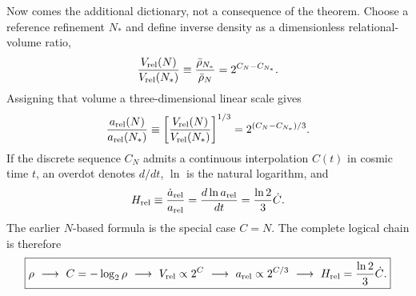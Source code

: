 \documentclass[10pt]{article}
\begin{document}
Now comes the additional dictionary, not a consequence of the theorem.  Choose
a reference refinement $N_*$ and define inverse density as a dimensionless
relational-volume ratio,
\begin{equation}
\frac{V_{\rm rel}(N)}{V_{\rm rel}(N_*)}
\equiv\frac{\bar\rho_{N_*}}{\bar\rho_N}
=2^{C_N-C_{N_*}}.
\label{eq:relational-volume}
\end{equation}
Assigning that volume a three-dimensional linear scale gives
\begin{equation}
\frac{a_{\rm rel}(N)}{a_{\rm rel}(N_*)}
\equiv\left[\frac{V_{\rm rel}(N)}{V_{\rm rel}(N_*)}\right]^{1/3}
=2^{(C_N-C_{N_*})/3}.
\label{eq:relational-scale}
\end{equation}
If the discrete sequence $C_N$ admits a continuous interpolation $C(t)$ in
cosmic time $t$, an overdot denotes $d/dt$, $\ln$ is the natural logarithm,
and
\begin{equation}
H_{\rm rel}\equiv\frac{\dot a_{\rm rel}}{a_{\rm rel}}
=\frac{d\ln a_{\rm rel}}{dt}
=\frac{\ln2}{3}\dot C.
\label{eq:bridge}
\end{equation}
The earlier $N$-based formula is the special case $C=N$.  The complete logical
chain is therefore
\begin{equation}
\boxed{
\rho\ \longrightarrow\ C=-\log_2\rho
\ \longrightarrow\ V_{\rm rel}\propto2^C
\ \longrightarrow\ a_{\rm rel}\propto2^{C/3}
\ \longrightarrow\ H_{\rm rel}=\frac{\ln2}{3}\dot C .}
\label{eq:dictionary-chain}
\end{equation}
\end{document}
